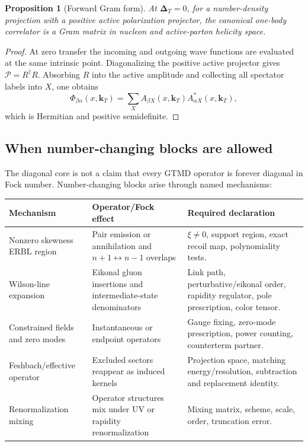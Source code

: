 \documentclass[11pt]{article}
\newtheorem{proposition}[definition]{Proposition}
\newcommand{\kT}{\bm{k}_{T}}
\newcommand{\DT}{\bm{\Delta}_{T}}
\newcommand{\cP}{\mathcal P}
\begin{document}
\begin{proposition}[Forward Gram form]
\label{prop:forward-gram}
At \(\DT=0\), for a number-density projection with a positive active
polarization projector, the canonical one-body correlator is a Gram matrix in
nucleon and active-parton helicity space.
\end{proposition}

\begin{proof}
At zero transfer the incoming and outgoing wave functions are evaluated at
the same intrinsic point.  Diagonalizing the positive active projector gives
\(\cP=R^\dagger R\).  Absorbing \(R\) into the active amplitude and collecting
all spectator labels into \(X\), one obtains
\begin{equation}
 \Phi_{\beta\alpha}(x,\kT)
 =\sum_X A_{\beta X}(x,\kT)A_{\alpha X}^*(x,\kT),
\end{equation}
which is Hermitian and positive semidefinite.
\end{proof}

\subsection{When number-changing blocks are allowed}

The diagonal core is not a claim that every GTMD operator is forever diagonal
in Fock number.  Number-changing blocks arise through named mechanisms:
\begin{longtable}{L{0.22\textwidth}L{0.35\textwidth}L{0.33\textwidth}}
\toprule
Mechanism & Operator/Fock effect & Required declaration\\
\midrule
\endhead
Nonzero skewness ERBL region & Pair emission or annihilation and \(n+1\leftrightarrow n-1\) overlaps & \(\xi\ne0\), support region, exact recoil map, polynomiality tests.\\
Wilson-line expansion & Eikonal gluon insertions and intermediate-state denominators & Link path, perturbative/eikonal order, rapidity regulator, pole prescription, color tensor.\\
Constrained fields and zero modes & Instantaneous or endpoint operators & Gauge fixing, zero-mode prescription, power counting, counterterm partner.\\
Feshbach/effective operator & Excluded sectors reappear as induced kernels & Projection space, matching energy/resolution, subtraction and replacement identity.\\
Renormalization mixing & Operator structures mix under UV or rapidity renormalization & Mixing matrix, scheme, scale, order, truncation error.\\
\bottomrule
\end{longtable}
\end{document}
